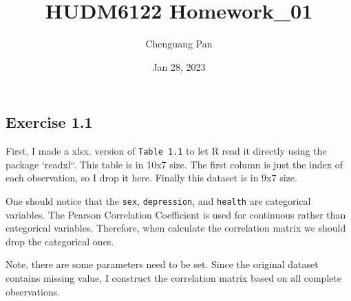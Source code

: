 \documentclass[
]{article}
\title{HUDM6122 Homework\_01}
\author{Chenguang Pan}
\date{Jan 28, 2023}
\begin{document}
\maketitle

\hypertarget{exercise-1.1}{%
\subsection{Exercise 1.1}\label{exercise-1.1}}

First, I made a xlsx. version of \texttt{Table\ 1.1} to let R read it
directly using the package `readxl``. This table is in 10x7 size. The
first column is just the index of each observation, so I drop it here.
Finally this dataset is in 9x7 size.

One should notice that the \texttt{sex}, \texttt{depression}, and
\texttt{health} are categorical variables. The Pearson Correlation
Coefficient is used for continuous rather than categorical variables.
Therefore, when calculate the correlation matrix we should drop the
categorical ones.

Note, there are some parameters need to be set. Since the original
dataset contains missing value, I construct the correlation matrix based
on all complete observations.
\end{document}
